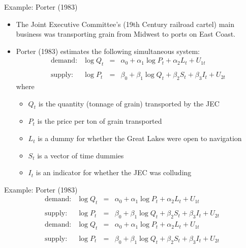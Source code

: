 \documentclass[aspectratio=169,11pt]{beamer}
\begin{document}
\begin{frame}{Example: Porter (1983)}
\begin{itemize}
	\item The Joint Executive Committee's (19th Century railroad cartel)
	main business was transporting grain from Midwest to ports on East Coast.

	\item Porter (1983) estimates the following simultaneous system:\[
\begin{array}{cccc}
\text{demand:} & \log Q_{t} & = & \alpha_{0}+\alpha_{1}\log P_{t}+\alpha_{2}L_{t}+U_{1t}\\
\\
\text{supply:} & \log P_{t} & = & \beta_{0}+\beta_{1}\log Q_{t}+\beta_{2}S_{t}+\beta_{3}I_{t}+U_{2t}
\end{array}
\]
where
\begin{itemize}
\item $Q_{t}$ is the quantity (tonnage of grain) transported by the JEC
\item $P_{t}$ is the price per ton of grain transported
\item $L_{t}$ is a dummy for whether the Great Lakes were open to navigation
\item $S_{t}$ is a vector of time dummies
\item $I_{t}$ is an indicator for whether the JEC was colluding
\end{itemize}
\end{itemize}
\end{frame}

\begin{frame}{Example: Porter (1983)}
\begin{align*}
	\text{demand:} & \log Q_{t} &=&  \alpha_{0}+\alpha_{1}\log P_{t}+\alpha_{2}L_{t}+U_{1t}\\
\\
	\text{supply:} & \log P_{t} &=&  \beta_{0}+\beta_{1}\log Q_{t}+\beta_{2}S_{t}+\beta_{3}I_{t}+U_{2t}
\end{align*}
\begin{align*}
	\text{demand:} & \log Q_{t} & = & \alpha_{0}+\alpha_{1}\log P_{t}+\alpha_{2}L_{t}+U_{1t}\\
\\
	\text{supply:} & \log P_{t} & = & \beta_{0}+\beta_{1}\log Q_{t}+\beta_{2}S_{t}+\beta_{3}I_{t}+U_{2t}
\end{align*}
\end{frame}
\end{document}
